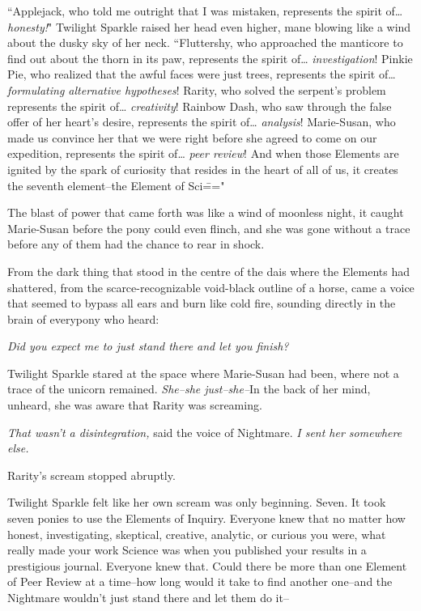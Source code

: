 
``Applejack, who told me outright that I was mistaken, represents the spirit of{\ldots} \emph{honesty!}" Twilight Sparkle raised her head even higher, mane blowing like a wind about the dusky sky of her neck. ``Fluttershy, who approached the manticore to find out about the thorn in its paw, represents the spirit of{\ldots} \emph{investigation}! Pinkie Pie, who realized that the awful faces were just trees, represents the spirit of{\ldots} \emph{formulating alternative hypotheses}! Rarity, who solved the serpent's problem represents the spirit of{\ldots} \emph{creativity}! Rainbow Dash, who saw through the false offer of her heart's desire, represents the spirit of{\ldots} \emph{analysis}! Marie-Susan, who made us convince her that we were right before she agreed to come on our expedition, represents the spirit of{\ldots} \emph{peer review}! And when those Elements are ignited by the spark of curiosity that resides in the heart of all of us, it creates the seventh element\---the Element of Sci\==="

The blast of power that came forth was like a wind of moonless night, it caught Marie-Susan before the pony could even flinch, and she was gone without a trace before any of them had the chance to rear in shock.

From the dark thing that stood in the centre of the dais where the Elements had shattered, from the scarce-recognizable void-black outline of a horse, came a voice that seemed to bypass all ears and burn like cold fire, sounding directly in the brain of everypony who heard:

\emph{Did you expect me to just stand there and let you finish?}

Twilight Sparkle stared at the space where Marie-Susan had been, where not a trace of the unicorn remained. \emph{She\---she just\---she\---}In the back of her mind, unheard, she was aware that Rarity was screaming.

\emph{That wasn't a disintegration,} said the voice of Nightmare. \emph{I sent her somewhere else.}

Rarity's scream stopped abruptly.

Twilight Sparkle felt like her own scream was only beginning. Seven. It took seven ponies to use the Elements of Inquiry. Everyone knew that no matter how honest, investigating, skeptical, creative, analytic, or curious you were, what really made your work Science was when you published your results in a prestigious journal. Everyone knew that. Could there be more than one Element of Peer Review at a time\---how long would it take to find another one\---and the Nightmare wouldn't just stand there and let them do it\---


